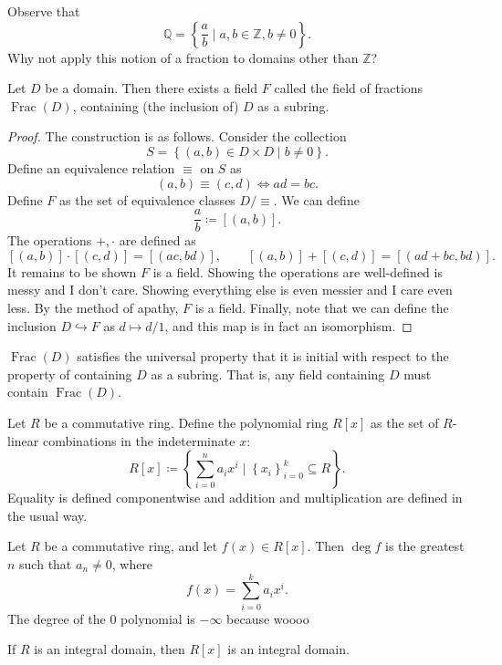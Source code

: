 Observe that
\[
	\mathbb{Q} = \left\{ \frac{a}{b} \mid a,b\in\mathbb{Z} ,b\neq 0 \right\} 
.\]
Why not apply this notion of a fraction to domains other than $\mathbb{Z} $?
\begin{proposition}\label{prp:1.6}
	Let $D$ be a domain. Then there exists a field $F$ called the field of fractions $\operatorname{Frac} (D)$, containing (the inclusion of) $D$ as a subring.
\end{proposition}
\begin{proof}
	The construction is as follows. Consider the collection
	\[
		S=\left\{ (a,b)\in D\times D\mid b\neq 0 \right\} 
	.\]
	Define an equivalence relation $\equiv $ on $S$ as
	\[
		(a,b)\equiv (c,d) \iff ad=bc
	.\]
	Define $F$ as the set of equivalence classes $D/\equiv $. We can define
	\[
		\frac{a}{b} \coloneqq [(a,b)]
	.\]
	The operations $+,\cdot $ are defined as
	\[
		[(a,b)]\cdot [(c,d)] = [(ac,bd)],\qquad [(a,b)]+[(c,d)]=[(ad+bc,bd)]
	.\]
	It remains to be shown $F$ is a field. Showing the operations are well-defined is messy and I don't care. Showing everything else is even messier and I care even less. By the method of apathy, $F$ is a field. Finally, note that we can define the inclusion $D\hookrightarrow F$ as $d\mapsto d/1$, and this map is in fact an isomorphism.
\end{proof}
$\operatorname{Frac} (D)$ satisfies the universal property that it is initial with respect to the property of containing $D$ as a subring. That is, any field containing $D$ must contain $\operatorname{Frac} (D)$.

\begin{definition}\label{dfn:1.9}
	Let $R$ be a commutative ring. Define the polynomial ring $R[x]$ as the set of $R$-linear combinations in the indeterminate $x$:
	\[
		R[x]\coloneqq \left\{ \sum_{i=0}^{n} a_ix^i\mid \left\{ x_i \right\}_{i=0}^k \subseteq R \right\} 
	.\]
Equality is defined componentwise and addition and multiplication are defined in the usual way.
\end{definition}
\begin{definition}[Degree]\label{dfn:1.10}
	Let $R$ be a commutative ring, and let $f(x)\in R[x]$. Then $\operatorname{deg} f$ is the greatest $n$ such that $a_n\neq 0$, where
	\[
		f(x)=\sum_{i=0}^{k} a_ix^i
	.\]
	The degree of the 0 polynomial is $-\infty $ because woooo
\end{definition}
\begin{proposition}\label{prp:1.7}
	If $R$ is an integral domain, then $R[x]$ is an integral domain.
\end{proposition}

